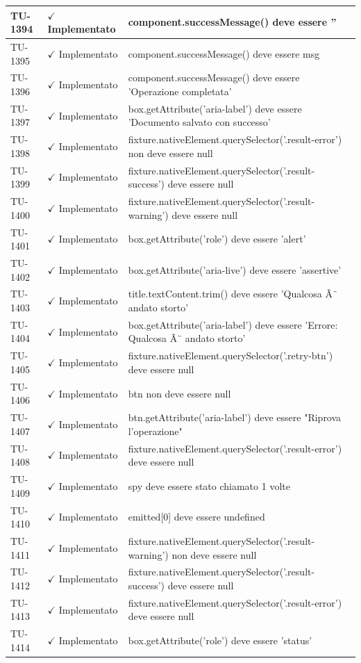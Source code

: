 ﻿\documentclass[a4paper,12pt]{article}
\newcommand{\ok}{\textcolor{green!60!black}{$\checkmark$ Implementato}}
\begin{document}
\begin{longtable}{|p{2cm}|p{3.5cm}|p{9.5cm}|}
\hline
TU-1394 & \ok & component.successMessage() deve essere '' \\
\hline
TU-1395 & \ok & component.successMessage() deve essere msg \\
\hline
TU-1396 & \ok & component.successMessage() deve essere 'Operazione completata' \\
\hline
TU-1397 & \ok & box.getAttribute('aria-label') deve essere 'Documento salvato con successo' \\
\hline
TU-1398 & \ok & fixture.nativeElement.querySelector('.result-error') non deve essere null \\
\hline
TU-1399 & \ok & fixture.nativeElement.querySelector('.result-success') deve essere null \\
\hline
TU-1400 & \ok & fixture.nativeElement.querySelector('.result-warning') deve essere null \\
\hline
TU-1401 & \ok & box.getAttribute('role') deve essere 'alert' \\
\hline
TU-1402 & \ok & box.getAttribute('aria-live') deve essere 'assertive' \\
\hline
TU-1403 & \ok & title.textContent.trim() deve essere 'Qualcosa Ã¨ andato storto' \\
\hline
TU-1404 & \ok & box.getAttribute('aria-label') deve essere 'Errore: Qualcosa Ã¨ andato storto' \\
\hline
TU-1405 & \ok & fixture.nativeElement.querySelector('.retry-btn') deve essere null \\
\hline
TU-1406 & \ok & btn non deve essere null \\
\hline
TU-1407 & \ok & btn.getAttribute('aria-label') deve essere "Riprova l'operazione" \\
\hline
TU-1408 & \ok & fixture.nativeElement.querySelector('.result-error') deve essere null \\
\hline
TU-1409 & \ok & spy deve essere stato chiamato 1 volte \\
\hline
TU-1410 & \ok & emitted[0] deve essere undefined \\
\hline
TU-1411 & \ok & fixture.nativeElement.querySelector('.result-warning') non deve essere null \\
\hline
TU-1412 & \ok & fixture.nativeElement.querySelector('.result-success') deve essere null \\
\hline
TU-1413 & \ok & fixture.nativeElement.querySelector('.result-error') deve essere null \\
\hline
TU-1414 & \ok & box.getAttribute('role') deve essere 'status' \\

\end{longtable}
\end{document}
